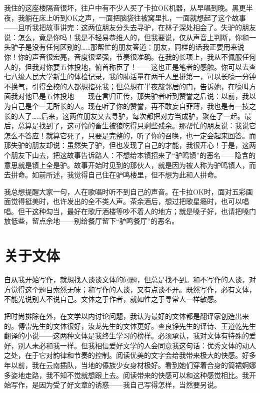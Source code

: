 我住的这座楼隔音很坏，往户中有不少人买了卡拉OK机器，从早唱到晚。黑更半夜，我躺在床上听到OK之声，一面把脑袋往被窝里扎，一面就想起了这个故事——且听我把故事讲完：这两位朋友分头去寻驴，在林子深处相会了。失驴的朋友说：怎么，竟是你吗！我是不轻易恭维人的，但我要说，仅从声音上判断，你和一头驴子是没有任何区别的……那帮忙的朋友答道：朋友，同样的话我正要用来说你！你的声音很宏亮，音度很坚强，节奏很准确。在我的长项上，我从不佩服任何人的，但我对你要五体投地，俯首称臣了！——这也正是笔者的感触。你可以去查七八级人民大学新生的体检记录，我的肺活量在两千人里排第一，可以长嚎一分钟不换气，引得全校的人都想掐死我；但总想在半夜敲邻居的门，告诉她，在嚎叫方面我对他已是五体投地——现在言归正传，那失驴者听到赞誉之后说：以前，我以为自己是个一无所长的人。现在听了你的赞誉，再不敢妄自菲薄，我也是有一技之长的人了……后来，这两位朋友又去寻驴，每次都把对方当成驴，聚在了一起。最后，总算是找到了，这可怜的畜生被狼吃得只剩些残余。那帮忙的朋友说：我说它怎么不答应！就算它死了，只要是完整的，听了你的召唤，也一定会起来回答。而那失驴的朋友却说：虽然失了驴，但也发现了自己的才能，我很开心！于是，这两个朋友下山去，把这故事告诉路人：不想给本镇招来了“驴鸣镇”的恶名——隐含的意思就是镇上全是驴。故事开始时见到的那伙人，就是因为被人称为驴鸣镇人，而去拼命。如前所述，我觉得自己住在驴鸣楼里，但不想为此和人拼命。 

我总想提醒大家一句，人在歌唱时听不到自己的声音。在卡拉OK时，面对五彩画面觉得挺美时，也许发出的全不类人声。茶余酒后，想过把歌星瘾时，也可以唱唱。但干这种勾当，最好在歌厅酒楼等吵不着人的地方；就是嗓子好，也请把嗓门放低些，留点余地——别给餐厅留下“驴鸣餐厅”的恶名。

\chapter{关于文体}

自从我开始写作，就想找人谈谈文体的问题，但总是找不到。和不写作的人谈，对方觉得这个题目索然无味；和写作的人谈，又有点谈不开。既然写作，必有文体，不能光说别人不说自己。文体之于作者，就如性之于寻常人一样敏感。　 

把时尚排除在外，在文学以内讨论问题，我认为最好的文体都是翻译家创造出来的。傅雷先生的文体很好，汝龙先生的文体更好。查良铮先生的译诗、王道乾先生翻译的小说——这两种文体是我终生学习的榜样。必须承认，我对文体有特殊的爱好，别人未必和我一样。但我相信爱好文学的人会同意我这句话：优秀文体的动人之处，在于它对韵律和节奏的控制。阅读优美的文字会给我带来极大的快感。好多年以前，我在云南插队，当地的傣族少女身材极好。看到她们穿着合身的筒裙婀娜多姿地走路，我不知不觉就想跟上去。阅读带来的快感可以和这种感觉相比。我开始写作，是因为受了好文章的诱惑——我自己写得怎样，当然要另说。　 

